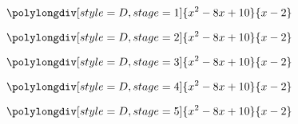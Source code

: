 \documentclass{article}
\begin{document}
$$
    \polylongdiv[style=D, stage=1]{x^2 - 8x + 10}{x - 2}
$$

$$
    \polylongdiv[style=D, stage=2]{x^2 - 8x + 10}{x - 2}
$$

$$
    \polylongdiv[style=D, stage=3]{x^2 - 8x + 10}{x - 2}
$$

$$
    \polylongdiv[style=D, stage=4]{x^2 - 8x + 10}{x - 2}
$$

$$
    \polylongdiv[style=D, stage=5]{x^2 - 8x + 10}{x - 2}
$$
\end{document}
